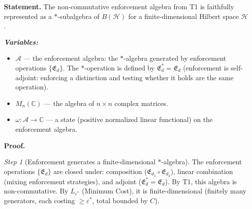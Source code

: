 \documentclass[11pt]{article}
\newenvironment{varlist}{\begin{itemize}[nosep,leftmargin=2em]}{\end{itemize}}
\begin{document}
\begin{tcolorbox}[apfbox, title={T2: Noncommutativity $\to$ Operator Algebra on Hilbert Space}]
\textbf{Statement.}  The non-commutative enforcement algebra from T1 is faithfully represented as a $*$-subalgebra of $B(\mathcal{H})$ for a finite-dimensional Hilbert space $\mathcal{H}$.

\smallskip\noindent\textbf{\textit{Variables:}}
\begin{varlist}
\item $\mathcal{A}$ --- the enforcement algebra: the $*$-algebra generated by enforcement operations $\{\mathfrak{E}_d\}$.  The $*$-operation is defined by $\mathfrak{E}_d^* = \mathfrak{E}_d$ (enforcement is self-adjoint: enforcing a distinction and testing whether it holds are the same operation).
\item $M_n(\mathbb{C})$ --- the algebra of $n \times n$ complex matrices.
\item $\omega: \mathcal{A} \to \mathbb{C}$ --- a state (positive normalized linear functional) on the enforcement algebra.
\end{varlist}

\smallskip\noindent\textbf{Proof.}

\textit{Step 1} (Enforcement generates a finite-dimensional $*$-algebra).  The enforcement operations $\{\mathfrak{E}_d\}$ are closed under: composition ($\mathfrak{E}_{d_1} \circ \mathfrak{E}_{d_2}$), linear combination (mixing enforcement strategies), and adjoint ($\mathfrak{E}_d^* = \mathfrak{E}_d$).  By T1, this algebra is non-commutative.  By $L_{\varepsilon^*}$ (Minimum Cost), it is finite-dimensional (finitely many generators, each costing $\ge \varepsilon^*$, total bounded by $C$).


\end{tcolorbox}
\end{document}

